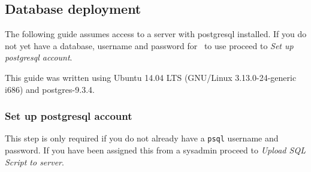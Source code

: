   \subsection{Database deployment}
    The following guide assumes access to a server with postgresql installed. If you do not yet have a database, username and password for \appName\ to use proceed to \emph{Set up postgresql account}.

    This guide was written using Ubuntu 14.04 LTS (GNU/Linux 3.13.0-24-generic i686) and postgres-9.3.4.

    \subsubsection{Set up postgresql account}
      This step is only required if you do not already have a \texttt{psql} username and password. If you have been assigned this from a sysadmin proceed to \emph{Upload SQL Script to server}.

